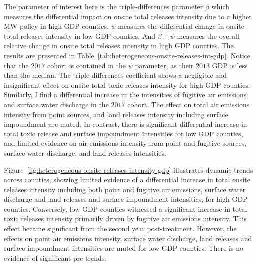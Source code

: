 \documentclass{C:/Users/david/OneDrive/Documents/ULMS/PhD/Thesis/chapter3/src/climate_change/latex/Economic_Journal/OUP-EJ}
\begin{document}
    The parameter of interest here is the triple-differences parameter $\beta$ which measures the differential impact on onsite total releases intensity due to a higher MW policy in high GDP counties. $\psi$ measures the differential change in onsite total releases intensity in low GDP counties. And $\beta + \psi$ measures the overall relative change in onsite total releases intensity in high GDP counties. The results are presented in Table~\ref{tab:heterogeneous-onsite-releases-int-gdp}. Notice that the $2017$ cohort is contained in the $\psi$ parameter, as their $2013$ GDP is less than the median. The triple-differences coefficient shows a negligible and insignificant effect on onsite total toxic releases intensity for high GDP counties. Similarly, I find a differential increase in the intensities of fugitive air emissions and surface water discharge in the $2017$ cohort. The effect on total air emissions intensity from point sources, and land releases intensity including surface impoundment are muted. In contrast, there is significant differential increase in total toxic release and surface impoundment intensities for low GDP counties, and limited evidence on air emissions intensity from point and fugitive sources, surface water discharge, and land releases intensities.
    
    

    Figure~\ref{fig:heterogeneous-onsite-releases-intensity-gdp} illustrates dynamic trends across counties, showing limited evidence of a differential increase in total onsite releases intensity including both point and fugitive air emissions, surface water discharge and land releases and surface impoundment intensities, for high GDP counties. Conversely, low GDP counties witnessed a significant increase in total toxic releases intensity primarily driven by fugitive air emissions intensity. This effect became significant from the second year post-treatment. However, the effects on point air emissions intensity, surface water discharge, land releases and surface impoundment intensities are muted for low GDP counties. There is no evidence of significant pre-trends.
\end{document}

